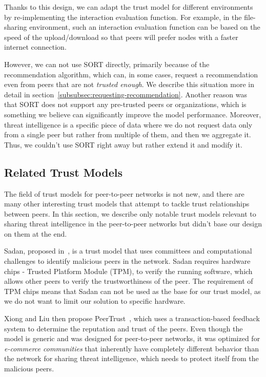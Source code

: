 Thanks to this design, we can adapt the trust model for different environments by re-implementing the interaction evaluation function.
For example, in the file-sharing environment, such an interaction evaluation function can be based on the speed of the upload/download so that peers will prefer nodes with a faster internet connection.

However, we can not use SORT directly, primarily because of the recommendation algorithm, which can, in some cases, request a recommendation even from peers that are not \textit{trusted enough}. We describe this situation more in detail in section~\ref{subsubsec:requesting-recommendation}.
Another reason was that SORT does not support any pre-trusted peers or organizations, which is something we believe can significantly improve the model performance.
Moreover, threat intelligence is a specific piece of data where we do not request data only from a single peer but rather from multiple of them, and then we aggregate it.
Thus, we couldn't use SORT right away but rather extend it and modify it.

\subsection{Related Trust Models}
\label{subsec:related-trust-models}
The field of trust models for peer-to-peer networks is not new, and there are many other interesting trust models that attempt to tackle trust relationships between peers.
In this section, we describe only notable trust models relevant to sharing threat intelligence in the peer-to-peer networks but didn't base our design on them at the end.

Sadan, proposed in~\cite{abera2019sadan}, is a trust model that uses committees and computational challenges to identify malicious peers in the network.
Sadan requires hardware chips - Trusted Platform Module (TPM), to verify the running software, which allows other peers to verify the trustworthiness of the peer.
The requirement of TPM chips means that Sadan can not be used as the base for our trust model, as we do not want to limit our solution to specific hardware.

Xiong and Liu then propose PeerTrust~\cite{xiong2004peertrust}, which uses a transaction-based feedback system to determine the reputation and trust of the peers.
Even though the model is generic and was designed for peer-to-peer networks, it was optimized for \textit{e-commerce communities} that inherently have completely different behavior than the network for sharing threat intelligence, which needs to protect itself from the malicious peers.

